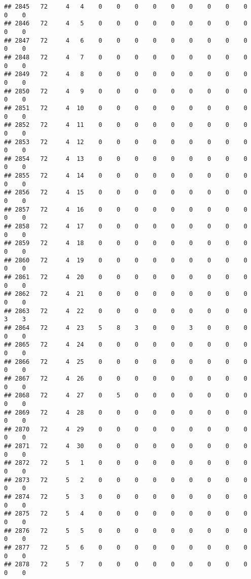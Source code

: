 \documentclass[]{article}
\begin{document}
\begin{verbatim}
## 2845   72     4   4    0    0    0    0    0    0    0    0    0    0    0
## 2846   72     4   5    0    0    0    0    0    0    0    0    0    0    0
## 2847   72     4   6    0    0    0    0    0    0    0    0    0    0    0
## 2848   72     4   7    0    0    0    0    0    0    0    0    0    0    0
## 2849   72     4   8    0    0    0    0    0    0    0    0    0    0    0
## 2850   72     4   9    0    0    0    0    0    0    0    0    0    0    0
## 2851   72     4  10    0    0    0    0    0    0    0    0    0    0    0
## 2852   72     4  11    0    0    0    0    0    0    0    0    0    0    0
## 2853   72     4  12    0    0    0    0    0    0    0    0    0    0    0
## 2854   72     4  13    0    0    0    0    0    0    0    0    0    0    0
## 2855   72     4  14    0    0    0    0    0    0    0    0    0    0    0
## 2856   72     4  15    0    0    0    0    0    0    0    0    0    0    0
## 2857   72     4  16    0    0    0    0    0    0    0    0    0    0    0
## 2858   72     4  17    0    0    0    0    0    0    0    0    0    0    0
## 2859   72     4  18    0    0    0    0    0    0    0    0    0    0    0
## 2860   72     4  19    0    0    0    0    0    0    0    0    0    0    0
## 2861   72     4  20    0    0    0    0    0    0    0    0    0    0    0
## 2862   72     4  21    0    0    0    0    0    0    0    0    0    0    0
## 2863   72     4  22    0    0    0    0    0    0    0    0    0    3    3
## 2864   72     4  23    5    8    3    0    0    3    0    0    0    0    0
## 2865   72     4  24    0    0    0    0    0    0    0    0    0    0    0
## 2866   72     4  25    0    0    0    0    0    0    0    0    0    0    0
## 2867   72     4  26    0    0    0    0    0    0    0    0    0    0    0
## 2868   72     4  27    0    5    0    0    0    0    0    0    0    0    0
## 2869   72     4  28    0    0    0    0    0    0    0    0    0    0    0
## 2870   72     4  29    0    0    0    0    0    0    0    0    0    0    0
## 2871   72     4  30    0    0    0    0    0    0    0    0    0    0    0
## 2872   72     5   1    0    0    0    0    0    0    0    0    0    0    0
## 2873   72     5   2    0    0    0    0    0    0    0    0    0    0    0
## 2874   72     5   3    0    0    0    0    0    0    0    0    0    0    0
## 2875   72     5   4    0    0    0    0    0    0    0    0    0    0    0
## 2876   72     5   5    0    0    0    0    0    0    0    0    0    0    0
## 2877   72     5   6    0    0    0    0    0    0    0    0    0    0    0
## 2878   72     5   7    0    0    0    0    0    0    0    0    0    0    0

\end{verbatim}
\end{document}
